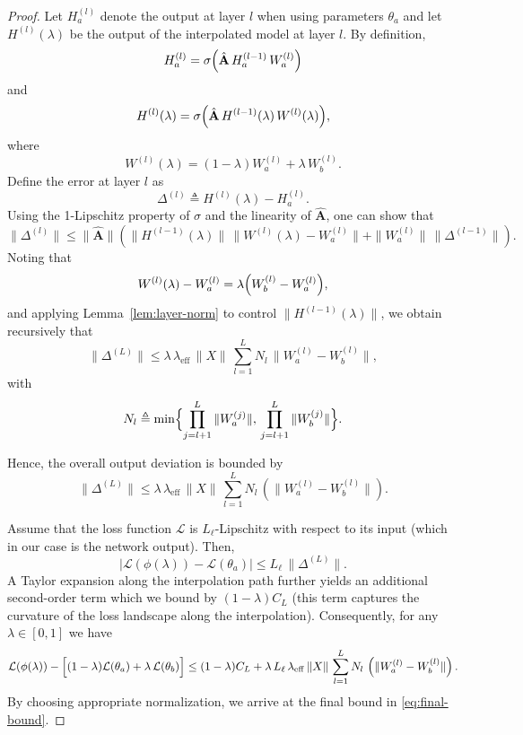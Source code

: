 \begin{proof}
    

Let \(H_a^{(l)}\) denote the output at layer \(l\) when using parameters \(\theta_a\) and let \(H^{(l)}(\lambda)\) be the output of the interpolated model at layer \(l\). By definition,
\[
H_a^{(l)} = \sigma\Bigl(\hat{\mathbf{A}}\,H_a^{(l-1)}\,W_a^{(l)}\Bigr)
\]
and
\[
H^{(l)}(\lambda) = \sigma\Bigl(\hat{\mathbf{A}}\,H^{(l-1)}(\lambda)\,W^{(l)}(\lambda)\Bigr),
\]
where
\[
W^{(l)}(\lambda) = (1-\lambda)W_a^{(l)} + \lambda\,W_b^{(l)}.
\]
Define the error at layer \(l\) as
\[
\Delta^{(l)} \triangleq H^{(l)}(\lambda) - H_a^{(l)}.
\]
Using the 1-Lipschitz property of \(\sigma\) and the linearity of \(\hat{\mathbf{A}}\), one can show that
\begin{equation}
\label{eq:delta-recursion}
\|\Delta^{(l)}\| \le \|\hat{\mathbf{A}}\| \left( \|H^{(l-1)}(\lambda)\|\,\|W^{(l)}(\lambda)-W_a^{(l)}\| + \|W_a^{(l)}\|\,\|\Delta^{(l-1)}\| \right).
\end{equation}
Noting that
\[
W^{(l)}(\lambda)-W_a^{(l)} = \lambda \Bigl(W_b^{(l)}-W_a^{(l)}\Bigr),
\]
and applying Lemma~\ref{lem:layer-norm} to control \(\|H^{(l-1)}(\lambda)\|\), we obtain recursively that
\begin{equation}
\|\Delta^{(L)}\| \le \lambda\,\lambda_{\mathrm{eff}}\,\|X\|\,\sum_{l=1}^{L} N_l\,\|W_a^{(l)}-W_b^{(l)}\|,
\end{equation}
with
\[
N_l \triangleq \min\Bigl\{ \prod_{j=l+1}^{L}\|W_a^{(j)}\|,\,\prod_{j=l+1}^{L}\|W_b^{(j)}\| \Bigr\}.
\]



Hence, the overall output deviation is bounded by
\begin{equation}
\label{eq:output-diff}
\|\Delta^{(L)}\| \le \lambda\,\lambda_{\mathrm{eff}}\,\|X\|\,\sum_{l=1}^{L} N_l\,\left( \|W_a^{(l)}-W_b^{(l)}\|  \right).
\end{equation}


Assume that the loss function \(\mathcal{L}\) is \(L_\ell\)-Lipschitz with respect to its input (which in our case is the network output). Then,
\[
\bigl|\mathcal{L}(\phi(\lambda)) - \mathcal{L}(\theta_a)\bigr| \le L_\ell\,\|\Delta^{(L)}\|.
\]
A Taylor expansion along the interpolation path further yields an additional second-order term which we bound by \((1-\lambda)C_L\) (this term captures the curvature of the loss landscape along the interpolation). Consequently, for any \(\lambda\in[0,1]\) we have
\begin{equation}
\label{eq:loss-bound-intermediate}
\mathcal{L}(\phi(\lambda)) - \Bigl[(1-\lambda)\mathcal{L}(\theta_a) + \lambda\,\mathcal{L}(\theta_b)\Bigr] \le (1-\lambda)C_L + \lambda\,L_\ell\,\lambda_{\mathrm{eff}}\,\|X\|\,\sum_{l=1}^{L} N_l\,\left( \|W_a^{(l)}-W_b^{(l)}\| \right).
\end{equation}
By choosing appropriate normalization, we arrive at the final bound in \eqref{eq:final-bound}.


\end{proof}
